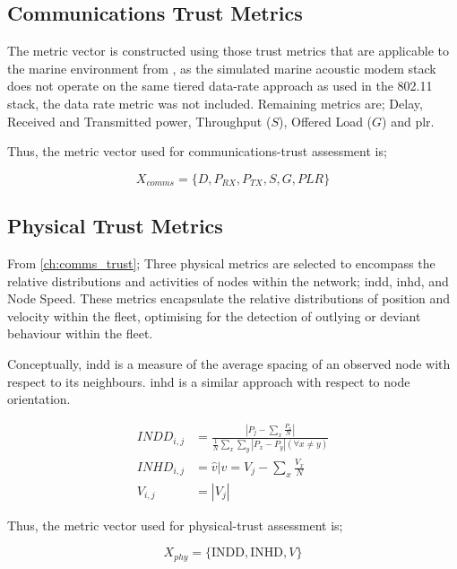 \subsection{Communications Trust Metrics}

The metric vector is constructed using those trust metrics that are applicable to the marine environment from \cite{Guo2012}, as the simulated marine acoustic modem stack does not operate on the same tiered data-rate approach as used in the 802.11 stack, the data rate metric was not included. Remaining metrics are; Delay, Received and Transmitted power, Throughput ($S$), Offered Load ($G$) and \gls{plr}.

Thus, the metric vector used for communications-trust assessment is;

\begin{equation}
  X_{comms}=\{D, P_{RX}, P_{TX}, S, G, PLR\}
  \label{eq:comms_vector}
\end{equation}

\subsection{Physical Trust Metrics}

From \autoref{ch:comms_trust}; Three physical metrics are selected to encompass the relative distributions and activities of nodes within the network; \gls{indd}, \gls{inhd}, and Node Speed. These metrics encapsulate the relative distributions of position and velocity within the fleet, optimising for the detection of outlying or deviant behaviour within the fleet.

Conceptually, \gls{indd} is a measure of the average spacing of an observed node with respect to its neighbours. \gls{inhd} is a similar approach with respect to node orientation.

\begin{align}
  INDD_{i,j} &= \frac{|P_j - \sum_x \frac{P_x}{N}|}{\frac{1}{N}\sum_x \sum_y{|P_x - P_y| (\forall x \neq y)}}\\
  INHD_{i,j} &= \hat{v} \vert v= V_j - \sum_x{\frac{V_x}{N}}\\
  V_{i,j} &= |V_j|
\end{align}

Thus, the metric vector used for physical-trust assessment is;

\begin{equation}
  X_{phy}=\{\text{INDD}, \text{INHD}, V\}
  \label{eq:phys:vector}
\end{equation}


